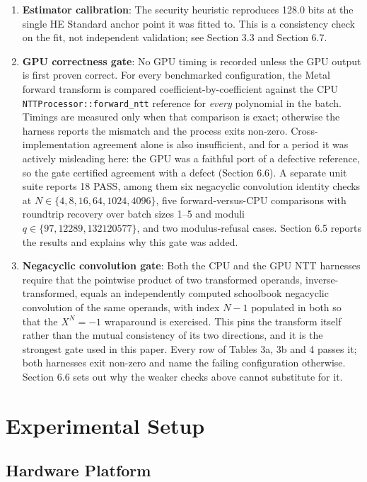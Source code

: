 \begin{enumerate}
\item
  \textbf{Estimator calibration}: The security heuristic reproduces 128.0 bits at the single HE Standard anchor point it was fitted to. This is a consistency check on the fit, not independent validation; see Section 3.3 and Section 6.7.
\item
  \textbf{GPU correctness gate}: No GPU timing is recorded unless the GPU output is first proven correct. For every benchmarked configuration, the Metal forward transform is compared coefficient-by-coefficient against the CPU \texttt{NTTProcessor::forward\_ntt} reference for \emph{every} polynomial in the batch. Timings are measured only when that comparison is exact; otherwise the harness reports the mismatch and the process exits non-zero. Cross-implementation agreement alone is also insufficient, and for a period it was actively misleading here: the GPU was a faithful port of a defective reference, so the gate certified agreement with a defect (Section 6.6). A separate unit suite reports 18 PASS, among them six negacyclic convolution identity checks at \(N \in \{4, 8, 16, 64, 1024, 4096\}\), five forward-versus-CPU comparisons with roundtrip recovery over batch sizes 1--5 and moduli \(q \in \{97, 12289, 132120577\}\), and two modulus-refusal cases. Section 6.5 reports the results and explains why this gate was added.
\item
  \textbf{Negacyclic convolution gate}: Both the CPU and the GPU NTT harnesses require that the pointwise product of two transformed operands, inverse-transformed, equals an independently computed schoolbook negacyclic convolution of the same operands, with index \(N - 1\) populated in both so that the \(X^N = -1\) wraparound is exercised. This pins the transform itself rather than the mutual consistency of its two directions, and it is the strongest gate used in this paper. Every row of Tables 3a, 3b and 4 passes it; both harnesses exit non-zero and name the failing configuration otherwise. Section 6.6 sets out why the weaker checks above cannot substitute for it.
\end{enumerate}

\section{Experimental Setup}\label{experimental-setup}

\subsection{Hardware Platform}\label{hardware-platform}

